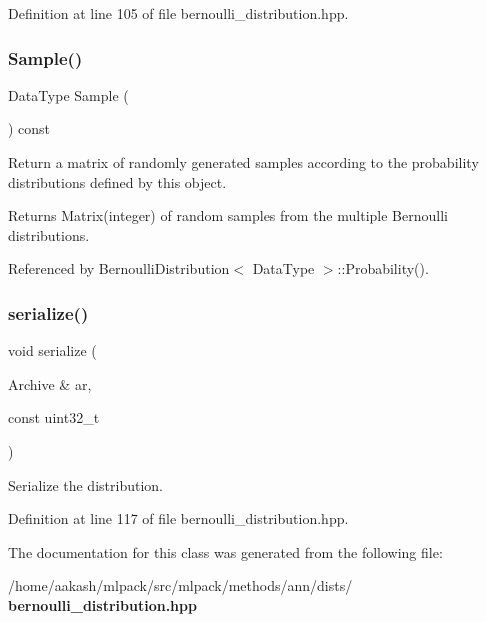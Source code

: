 Definition at line 105 of file bernoulli\+\_\+distribution.\+hpp.

\mbox{\label{classmlpack_1_1ann_1_1BernoulliDistribution_a59b1e2962ad6370100f34906d6fddd76}} 
\subsubsection{Sample()}
{\footnotesize\ttfamily Data\+Type Sample (\begin{DoxyParamCaption}{ }\end{DoxyParamCaption}) const}



Return a matrix of randomly generated samples according to the probability distributions defined by this object. 

\begin{DoxyReturn}{Returns}
Matrix(integer) of random samples from the multiple Bernoulli distributions. 
\end{DoxyReturn}


Referenced by Bernoulli\+Distribution$<$ Data\+Type $>$\+::\+Probability().

\mbox{\label{classmlpack_1_1ann_1_1BernoulliDistribution_a65cba07328997659bec80b9879b15a51}} 
\subsubsection{serialize()}
{\footnotesize\ttfamily void serialize (\begin{DoxyParamCaption}\item[{Archive \&}]{ar,  }\item[{const uint32\+\_\+t}]{ }\end{DoxyParamCaption})\hspace{0.3cm}{\ttfamily [inline]}}



Serialize the distribution. 



Definition at line 117 of file bernoulli\+\_\+distribution.\+hpp.



The documentation for this class was generated from the following file\+:\begin{DoxyCompactItemize}
\item 
/home/aakash/mlpack/src/mlpack/methods/ann/dists/\textbf{ bernoulli\+\_\+distribution.\+hpp}\end{DoxyCompactItemize}
